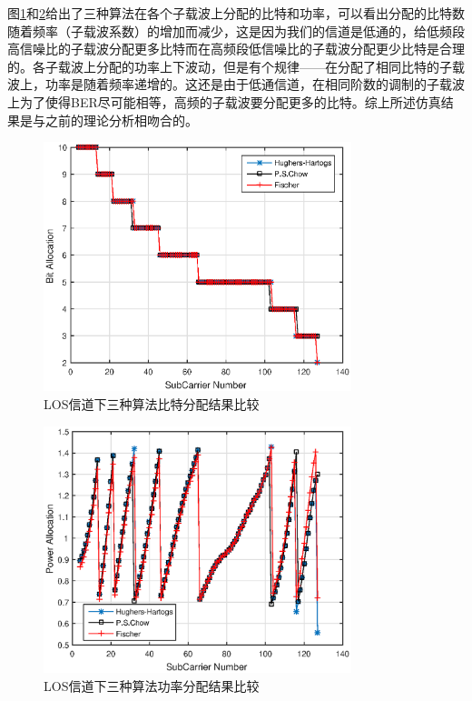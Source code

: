 图\ref{fig:loadedBit}和\ref{fig:loadedPower}给出了三种算法在各个子载波上分配的比特和功率，可以看出分配的比特数随着频率（子载波系数）的增加而减少，这是因为我们的信道是低通的，给低频段高信噪比的子载波分配更多比特而在高频段低信噪比的子载波分配更少比特是合理的。各子载波上分配的功率上下波动，但是有个规律——在分配了相同比特的子载波上，功率是随着频率递增的。这还是由于低通信道，在相同阶数的调制的子载波上为了使得BER尽可能相等，高频的子载波要分配更多的比特。综上所述仿真结果是与之前的理论分析相吻合的。
\begin{figure}[htbp]
\centering
\includegraphics[width=0.8\textwidth]{figures/chapter-4/loadedBit.eps}
\caption{LOS信道下三种算法比特分配结果比较}
\label{fig:loadedBit}
\end{figure}

\begin{figure}[htbp]
\centering
\includegraphics[width=0.8\textwidth]{figures/chapter-4/loadedPower.eps}
\caption{LOS信道下三种算法功率分配结果比较}
\label{fig:loadedPower}
\end{figure}
